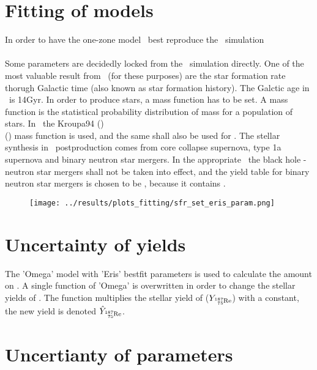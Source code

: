 \section{Fitting of models}

\newcommand\thesisfolder{/home/oyvind/github\_uio/Master/latex/thesis/}

In order to have the one-zone model \omegamodel\, best reproduce the \eris\, simulation \\
 \\
Some parameters are decidedly locked from the \eris\, simulation directly.
One of the most valuable result from \eris\, (for these purposes)
are the star formation rate thorugh Galactic time (also known as star formation history). The Galctic age in \eris\, is 14Gyr.
In order to produce stars, a mass function has to be set. A mass function is the statistical probability distribution of mass for a population of stars. In \eris\, the Kroupa94
()\\
()
mass function is used, and the same shall also be used for \omegamodel. 
The stellar synthesis in \eris\, postproduction comes from core collapse supernova, type 1a supernova and binary neutron star mergers.
In the appropriate \omegamodel\, the black hole - neutron star mergers shall not be taken into effect,
and the yield table for binary neutron star mergers is chosen to be  , because it contains .


\begin{figure}
  \centering
  \texttt{[image: ../results/plots\_fitting/sfr\_set\_eris\_param.png]}
  \caption{\label{img:fitting-set-eris-sfr}}
\end{figure}

\section{Uncertainty of yields}
The 'Omega' model with 'Eris' bestfit parameters is used to calculate the amount on .
A single function of 'Omega' is overwritten in order to change the stellar yields of .
The function multiplies the stellar yield of  ($Y_\re{187}$) with a constant, the new yield is denoted $\hat{Y}_\re{187}$.


\section{Uncertianty of parameters}
